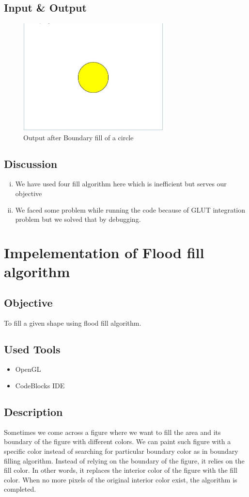 \documentclass[11pt]{report}
\begin{document}
\section{Input \& Output}
\begin{figure}[ht!]
	\centering
	\includegraphics[height=2.3in]{boundery_output}
	\caption{Output after Boundary fill of a circle}
\end{figure}

\section{Discussion}
\begin{enumerate}[(i)]
	\item We have used four fill algorithm here which is inefficient but serves our objective
	\item We faced some problem while running the code because of GLUT integration problem but we solved that by debugging.
\end{enumerate}


\chapter{Impelementation of Flood fill algorithm}
\section{Objective}
To fill a given shape using flood fill algorithm.
\section{Used Tools}
\begin{itemize}
	\item OpenGL
	\item CodeBlocks IDE
\end{itemize}


\section{Description}
Sometimes we come across a figure where we want to fill the area and its boundary of the figure with different colors. We can paint such figure with a specific color instead of searching for particular boundary color as in boundary filling algorithm. Instead of relying on the boundary of the figure, it relies on the fill color. In other words, it replaces the interior color of the figure with the fill color. When no more pixels of the original interior color exist, the algorithm is completed.
\end{document}
